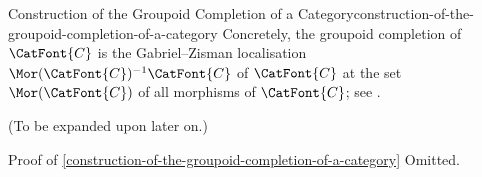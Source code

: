 \begin{construction}{Construction of the Groupoid Completion of a Category}{construction-of-the-groupoid-completion-of-a-category}%
    Concretely, the groupoid completion of $\CatFont{C}$ is the Gabriel--Zisman localisation $\Mor(\CatFont{C})^{-1}\CatFont{C}$ of $\CatFont{C}$ at the set $\Mor(\CatFont{C})$ of all morphisms of $\CatFont{C}$; see .

    (To be expanded upon later on.)
\end{construction}
\begin{Proof}{Proof of \cref{construction-of-the-groupoid-completion-of-a-category}}%
    Omitted.
\end{Proof}
